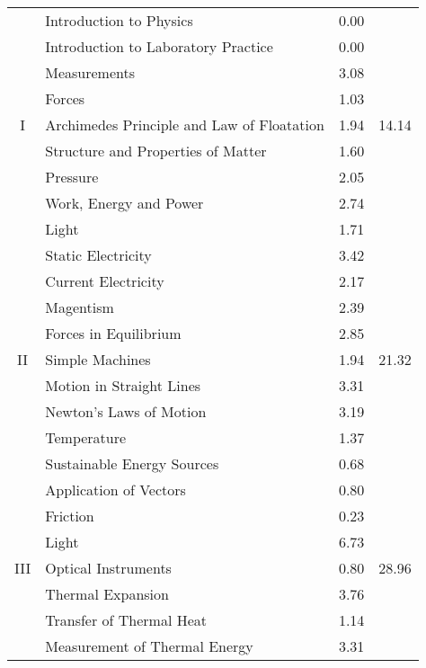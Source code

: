 \begin{center}
\begin{longtable}{|c|l|c|c|}
		\multirow{9}{*}{I} 	& Introduction to Physics 					& 0.00 & \multirow{9}{*}{14.14} 	\\ \cline{2-3}
						& Introduction to Laboratory Practice 		& 0.00 & 					\\ \cline{2-3}
						& Measurements						& 3.08 & 					\\ \cline{2-3}
						& Forces 								& 1.03 & 					\\ \cline{2-3}
						& Archimedes Principle and Law of Floatation 	& 1.94 & 					\\ \cline{2-3}
						& Structure and Properties of Matter 			& 1.60 & 					\\ \cline{2-3}
						& Pressure							& 2.05 & 					\\ \cline{2-3}
						& Work, Energy and Power				& 2.74 & 					\\ \cline{2-3}
						& Light 								& 1.71 & 					\\ \hline
		\multirow{9}{*}{II} 	& Static Electricity	 					& 3.42 & \multirow{9}{*}{21.32}	\\ \cline{2-3}
						& Current Electricity				 		& 2.17 & 					\\ \cline{2-3}
						& Magentism							& 2.39 & 					\\ \cline{2-3}
						& Forces in Equilibrium					& 2.85 & 					\\ \cline{2-3}
						& Simple Machines					 	& 1.94 & 					\\ \cline{2-3}
						& Motion in Straight Lines		 			& 3.31 & 					\\ \cline{2-3}
						& Newton's Laws of Motion				& 3.19 & 					\\ \cline{2-3}
						& Temperature							& 1.37 & 					\\ \cline{2-3}
						& Sustainable Energy Sources				& 0.68 & 					\\ \hline
		\multirow{9}{*}{III}	& Application of Vectors					& 0.80 & \multirow{9}{*}{28.96}	\\ \cline{2-3}
						& Friction								& 0.23 & 					\\ \cline{2-3}
						& Light								& 6.73 & 					\\ \cline{2-3}
						& Optical Instruments					& 0.80 & 					\\ \cline{2-3}
						& Thermal Expansion					& 3.76 & 					\\ \cline{2-3}
						& Transfer of Thermal Heat				& 1.14 & 					\\ \cline{2-3}
						& Measurement of Thermal Energy			& 3.31 & 					\\ \cline{2-3}

\end{longtable}
\end{center}
